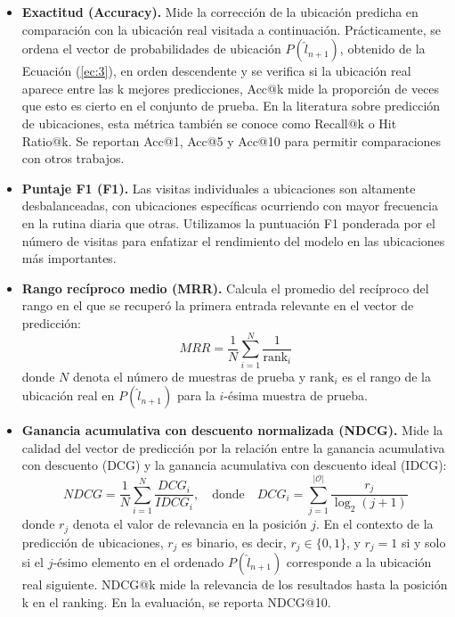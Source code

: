 \begin{itemize}
    \item \textbf{Exactitud (Accuracy).} Mide la correcci\'on de la 
    ubicaci\'on predicha en comparaci\'on con la ubicaci\'on real visitada 
    a continuaci\'on. Pr\'acticamente, se ordena el vector de probabilidades 
    de ubicaci\'on $P (\hat{l}_{n+1})$, obtenido de la Ecuaci\'on (\ref{ec:3}), en orden 
    descendente y se verifica si la ubicaci\'on real aparece entre las 
    k mejores predicciones, Acc@k mide la proporci\'on de veces que esto 
    es cierto en el conjunto de prueba. En la literatura sobre predicci\'on 
    de ubicaciones, esta m\'etrica tambi\'en se conoce como Recall@k 
    o Hit Ratio@k. Se reportan Acc@1, Acc@5 y Acc@10 para permitir 
    comparaciones con otros trabajos.

    \item \textbf{Puntaje F1 (F1).} Las visitas individuales a ubicaciones 
    son altamente desbalanceadas, con ubicaciones espec\'ificas ocurriendo 
    con mayor frecuencia en la rutina diaria que otras. Utilizamos la 
    puntuaci\'on F1 ponderada por el n\'umero de visitas para enfatizar 
    el rendimiento del modelo en las ubicaciones m\'as importantes.

    \item \textbf{Rango rec\'iproco medio (MRR).} Calcula el promedio del 
    rec\'iproco del rango en el que se recuper\'o la primera entrada 
    relevante en el vector de predicci\'on:
    \begin{equation}
        MRR = \frac{1}{N} \sum_{i=1}^{N} \frac{1}{\text{rank}_i} \tag{5}
    \end{equation}
    donde $N$ denota el n\'umero de muestras de prueba y $\text{rank}_i$ 
    es el rango de la ubicaci\'on real en $P (\hat{l}_{n+1})$ para 
    la $i$-\'esima muestra de prueba.

    \item \textbf{Ganancia acumulativa con descuento normalizada (NDCG).} 
    Mide la calidad del vector de predicci\'on por la relaci\'on entre la 
    ganancia acumulativa con descuento (DCG) y la ganancia acumulativa con 
    descuento ideal (IDCG):
    \begin{equation}
        NDCG = \frac{1}{N} \sum_{i=1}^{N} \frac{DCG_i}{IDCG_i}, 
        \quad \text{donde} \quad DCG_i = \sum_{j=1}^{|\mathcal{O}|} \frac{r_j}{\log_2(j + 1)} \tag{6}
    \end{equation}
    donde $r_j$ denota el valor de relevancia en la posici\'on $j$. 
    En el contexto de la predicci\'on de ubicaciones, $r_j$ es binario, 
    es decir, $r_j \in \{0, 1\}$, y $r_j = 1$ si y solo si el $j$-\'esimo 
    elemento en el ordenado $P (\hat{l}_{n+1})$ corresponde a la 
    ubicaci\'on real siguiente. NDCG@k mide la relevancia de los 
    resultados hasta la posici\'on k en el ranking. En la 
    evaluaci\'on, se reporta NDCG@10.
\end{itemize}
\newpage
